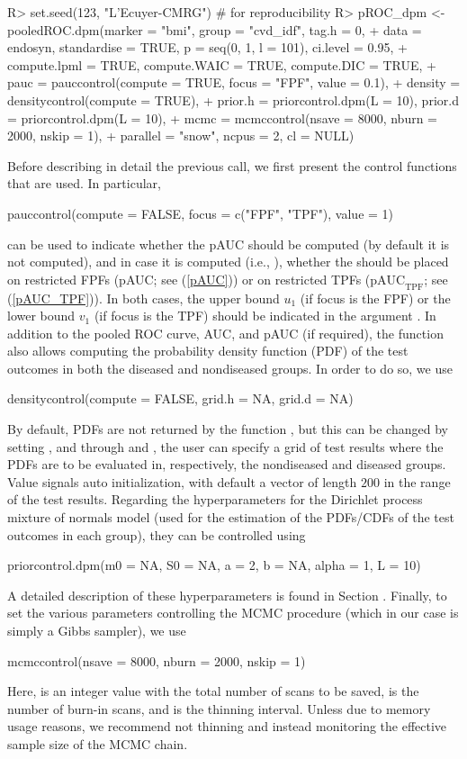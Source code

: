 \begin{example}
R> set.seed(123, "L'Ecuyer-CMRG") # for reproducibility
R> pROC_dpm <- pooledROC.dpm(marker = "bmi", group = "cvd_idf", tag.h = 0, 
+ data = endosyn, standardise = TRUE, p = seq(0, 1, l = 101), ci.level = 0.95,  
+ compute.lpml = TRUE, compute.WAIC = TRUE, compute.DIC = TRUE,
+ pauc = pauccontrol(compute = TRUE, focus = "FPF", value = 0.1), 
+ density = densitycontrol(compute = TRUE), 
+ prior.h = priorcontrol.dpm(L = 10), prior.d = priorcontrol.dpm(L = 10), 
+ mcmc = mcmccontrol(nsave = 8000, nburn = 2000, nskip = 1),
+ parallel = "snow", ncpus = 2, cl = NULL)
\end{example}
Before describing in detail the previous call, we first present the control functions that are used. In particular,
\begin{example}
pauccontrol(compute = FALSE, focus = c("FPF", "TPF"), value = 1)
\end{example}
can be used to indicate whether the pAUC should be computed (by default it is not computed), and in case it is computed (i.e.,  ), whether the  should be placed on restricted FPFs (pAUC; see (\ref{pAUC})) or on restricted TPFs ($\text{pAUC}_{\text{TPF}}$; see (\ref{pAUC_TPF})). In both cases, the upper bound $u_1$ (if focus is the FPF) or the lower bound $v_1$ (if focus is the TPF) should be indicated in the argument . In addition to the pooled ROC curve, AUC, and pAUC (if required), the function  also allows computing the probability density function (PDF) of the test outcomes in both the diseased and nondiseased groups. In order to do so, we use
\begin{example}
densitycontrol(compute = FALSE, grid.h = NA, grid.d = NA)
\end{example}
By default, PDFs are not returned by the function , but this can be changed by setting , and through  and , the user can specify a grid of test results where the PDFs are to be evaluated in, respectively, the nondiseased and diseased groups. Value  signals auto initialization, with default a vector of length $200$ in the range of the test results. Regarding the hyperparameters for the Dirichlet process mixture of normals model (used for the estimation of the PDFs/CDFs of the test outcomes in each group), they can be controlled using
\begin{example}
priorcontrol.dpm(m0 = NA, S0 = NA, a = 2, b = NA, alpha = 1, L = 10)
\end{example}
A detailed description of these hyperparameters is found in Section . Finally, to set the various parameters controlling the MCMC procedure (which in our case is simply a Gibbs sampler), we use
\begin{example}
mcmccontrol(nsave = 8000, nburn = 2000, nskip = 1)
\end{example}
Here,  is an integer value with the total number of scans to be saved,  is the number of burn-in scans, and  is the thinning interval. Unless due to memory usage reasons, we recommend not thinning and instead monitoring the effective sample size of the MCMC chain.

